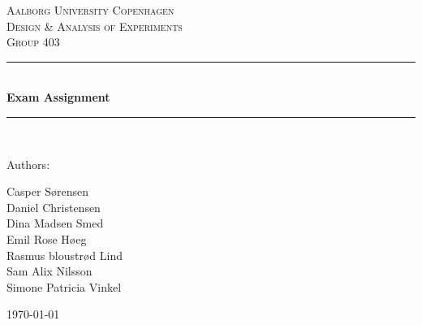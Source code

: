 \documentclass[11pt,a4paper]{report}
\begin{document}
\begin{titlepage}
\center %
\newcommand{\HRule}{\rule{\linewidth}{0.5mm}} %



\textsc{\LARGE Aalborg University Copenhagen}\\[1.5cm] %
\textsc{\Large Design \& Analysis of Experiments}\\[0.5cm] %
\textsc{\large Group 403}\\[0.5cm] %


\HRule \\[0.4cm]
{ \huge \bfseries Exam Assignment}\\[0.4cm] %
\HRule \\[1.5cm]

\vspace*{2\baselineskip} %

Authors: \\[\baselineskip]
{\Large Casper Sørensen \\ Daniel Christensen \\ Dina Madsen Smed \\ Emil Rose Høeg \\ Rasmus bloustrød Lind  \\ Sam Alix Nilsson \\ Simone Patricia Vinkel\par} %

\begin{minipage}{0.4\textwidth}
\author{
	Christensen, Daniel\\
	\and
	Høeg, Emil Rose \\
	\and
	Lind, Rasmus Bloustrød\\
	\and
	Nilsson, Sam Alix \\
	\and
	Smed, Dina Madsen\\	
	\and
	Sørensen, Casper\\
	\and
	Vinkel, Simone Patricia \\
}
\end{minipage}

\vspace*{15\baselineskip}
{\large \today}\\[3cm]

\end{titlepage}
\end{document}
